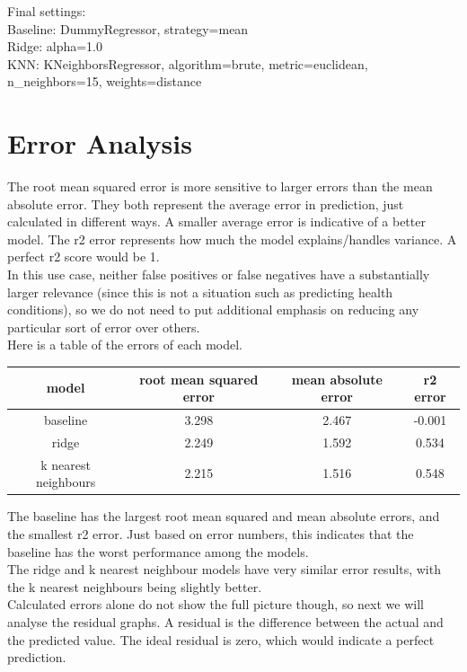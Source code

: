 \documentclass[a4paper, 12pt]{article}
\begin{document}
Final settings:\\
Baseline: DummyRegressor, strategy=mean\\
Ridge: alpha=1.0\\
KNN: KNeighborsRegressor, algorithm=brute, metric=euclidean, n\_neighbors=15, weights=distance\\

\section{Error Analysis}
The root mean squared error is more sensitive to larger errors than the mean absolute error. They both represent the average error in prediction, just calculated in different ways. A smaller average error is indicative of a better model. 
The r2 error represents how much the model explains/handles variance. A perfect r2 score would be 1.\\
In this use case, neither false positives or false negatives have a substantially larger relevance (since this is not a situation such as predicting health conditions), so we do not need to put additional emphasis on reducing any particular sort of error over others.\\
Here is a table of the errors of each model.\vspace{0.5cm}\\
\begin{tabular}{|c|c|c|c|}
\hline
 model    & root mean squared error & mean absolute error & r2 error \\
\hline
 baseline & 3.298 & 2.467   & -0.001 \\
\hline
 ridge    & 2.249 & 1.592   & 0.534 \\
\hline
 k nearest neighbours      & 2.215 & 1.516   & 0.548 \\
\hline
\end{tabular}

The baseline has the largest root mean squared and mean absolute errors, and the smallest r2 error. Just based on error numbers, this indicates that the baseline has the worst performance among the models.\\
The ridge and k nearest neighbour models have very similar error results, with the k nearest neighbours being slightly better. \\

Calculated errors alone do not show the full picture though, so next we will analyse the residual graphs. A residual is the difference between the actual and the predicted value. The ideal residual is zero, which would indicate a perfect prediction.\\
\end{document}
